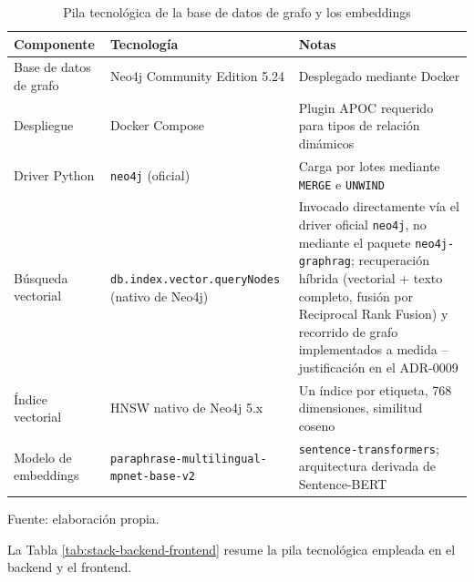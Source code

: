 \documentclass[11pt,a4paper,spanish]{book}
\numberwithin{equation}{chapter}
\numberwithin{figure}{chapter}
\numberwithin{table}{chapter}
\begin{document}
\begin{table}[h]
\centering
\begin{tabular}{|p{2.8cm}|p{3.8cm}|p{5.7cm}|}
	\hline
	\textbf{Componente} & \textbf{Tecnología} & \textbf{Notas} \\
	\hline
	Base de datos de grafo & Neo4j Community Edition 5.24 & Desplegado mediante Docker \\
	\hline
	Despliegue & Docker Compose & Plugin APOC requerido para tipos de relación dinámicos \\
	\hline
	Driver Python & \texttt{neo4j} (oficial) & Carga por lotes mediante \texttt{MERGE} e \texttt{UNWIND} \\
	\hline
	Búsqueda vectorial & \texttt{db.index.vector.queryNodes} (nativo de Neo4j) & Invocado directamente vía el driver oficial \texttt{neo4j}, no mediante el paquete \texttt{neo4j-graphrag}; recuperación híbrida (vectorial + texto completo, fusión por Reciprocal Rank Fusion) y recorrido de grafo implementados a medida -- justificación en el ADR-0009 \\
	\hline
	Índice vectorial & HNSW nativo de Neo4j 5.x & Un índice por etiqueta, 768 dimensiones, similitud coseno \\
	\hline
	Modelo de embeddings & {\fontsize{8}{9.5}\selectfont\texttt{paraphrase-}\newline\texttt{multilingual-}\newline\texttt{mpnet-base-v2}} & \texttt{sentence-transformers}; arquitectura derivada de Sentence-BERT \cite{reimers2019sbert} \\
	\hline
\end{tabular}
\caption{Pila tecnológica de la base de datos de grafo y los embeddings}
\label{tab:stack-grafo}
{\footnotesize\centering Fuente: elaboración propia.\par}
\end{table}

La Tabla \ref{tab:stack-backend-frontend} resume la pila tecnológica empleada en el backend y el frontend.
\end{document}
